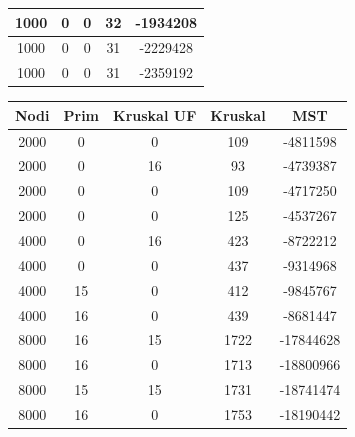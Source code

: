 \documentclass[a4paper]{article}
\begin{document}
\begin{table}[H]
\begin{minipage}[t]{10cm}
\begin{tabular}{|c|c|c|c|c|}
      1000          & 0             & 0                   & 32               & -1934208     \\ \hline
      1000          & 0             & 0                   & 31               & -2229428     \\ \hline
      1000          & 0             & 0                   & 31               & -2359192     \\ \hline
    \end{tabular}
  \end{minipage}
  \begin{minipage}[t]{10cm}
    \vspace{0pt}
    \begin{tabular}{|c|c|c|c|c|}
      \hline
      \rowcolor{gray!50}
      \textbf{Nodi} & \textbf{Prim} & \textbf{Kruskal UF} & \textbf{Kruskal} & \textbf{MST} \\ \hline
      2000          & 0             & 0                   & 109              & -4811598     \\ \hline
      2000          & 0             & 16                  & 93               & -4739387     \\ \hline
      2000          & 0             & 0                   & 109              & -4717250     \\ \hline
      2000          & 0             & 0                   & 125              & -4537267     \\ \hline
      4000          & 0             & 16                  & 423              & -8722212     \\ \hline
      4000          & 0             & 0                   & 437              & -9314968     \\ \hline
      4000          & 15            & 0                   & 412              & -9845767     \\ \hline
      4000          & 16            & 0                   & 439              & -8681447     \\ \hline
      8000          & 16            & 15                  & 1722             & -17844628    \\ \hline
      8000          & 16            & 0                   & 1713             & -18800966    \\ \hline
      8000          & 15            & 15                  & 1731             & -18741474    \\ \hline
      8000          & 16            & 0                   & 1753             & -18190442    \\ \hline

\end{tabular}
\end{minipage}
\end{table}
\end{document}
